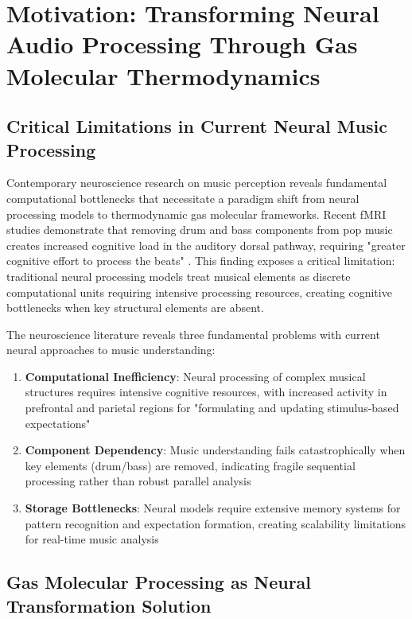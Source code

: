 \section{Motivation: Transforming Neural Audio Processing Through Gas Molecular Thermodynamics}

\subsection{Critical Limitations in Current Neural Music Processing}

Contemporary neuroscience research on music perception reveals fundamental computational bottlenecks that necessitate a paradigm shift from neural processing models to thermodynamic gas molecular frameworks. Recent fMRI studies demonstrate that removing drum and bass components from pop music creates increased cognitive load in the auditory dorsal pathway, requiring "greater cognitive effort to process the beats" \cite{zalta2024neural}. This finding exposes a critical limitation: traditional neural processing models treat musical elements as discrete computational units requiring intensive processing resources, creating cognitive bottlenecks when key structural elements are absent.

The neuroscience literature reveals three fundamental problems with current neural approaches to music understanding:

\begin{enumerate}
\item \textbf{Computational Inefficiency}: Neural processing of complex musical structures requires intensive cognitive resources, with increased activity in prefrontal and parietal regions for "formulating and updating stimulus-based expectations" \cite{matthews2020groove}
\item \textbf{Component Dependency}: Music understanding fails catastrophically when key elements (drum/bass) are removed, indicating fragile sequential processing rather than robust parallel analysis
\item \textbf{Storage Bottlenecks}: Neural models require extensive memory systems for pattern recognition and expectation formation, creating scalability limitations for real-time music analysis
\end{enumerate}

\subsection{Gas Molecular Processing as Neural Transformation Solution}


